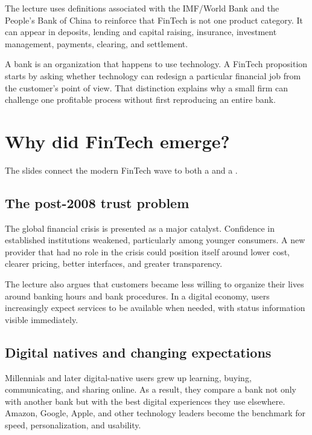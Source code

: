 The lecture uses definitions associated with the IMF/World Bank and the People's Bank of China to reinforce that FinTech is not one product category. It can appear in deposits, lending and capital raising, insurance, investment management, payments, clearing, and settlement.

\begin{intuition}
A bank is an organization that happens to use technology. A FinTech proposition starts by asking whether technology can redesign a particular financial job from the customer's point of view. That distinction explains why a small firm can challenge one profitable process without first reproducing an entire bank.
\end{intuition}

\section{Why did FinTech emerge?}

The slides connect the modern FinTech wave to both a  and a .

\subsection{The post-2008 trust problem}

The global financial crisis is presented as a major catalyst. Confidence in established institutions weakened, particularly among younger consumers. A new provider that had no role in the crisis could position itself around lower cost, clearer pricing, better interfaces, and greater transparency.

The lecture also argues that customers became less willing to organize their lives around banking hours and bank procedures. In a digital economy, users increasingly expect services to be available when needed, with status information visible immediately.

\subsection{Digital natives and changing expectations}

Millennials and later digital-native users grew up learning, buying, communicating, and sharing online. As a result, they compare a bank not only with another bank but with the best digital experiences they use elsewhere. Amazon, Google, Apple, and other technology leaders become the benchmark for speed, personalization, and usability.

